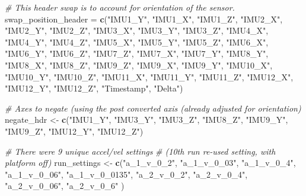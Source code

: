 \documentclass[]{article}
\newenvironment{Shaded}{\begin{snugshade}}{\end{snugshade}}
\newcommand{\CommentTok}[1]{\textcolor[rgb]{0.56,0.35,0.01}{\textit{#1}}}
\newcommand{\KeywordTok}[1]{\textcolor[rgb]{0.13,0.29,0.53}{\textbf{#1}}}
\newcommand{\NormalTok}[1]{#1}
\newcommand{\StringTok}[1]{\textcolor[rgb]{0.31,0.60,0.02}{#1}}
\begin{document}
\begin{Shaded}
\begin{Highlighting}[]
\CommentTok{# This header swap is to account for orientation of the sensor.}
\NormalTok{swap_position_header =}\StringTok{ }\KeywordTok{c}\NormalTok{(}\StringTok{"IMU1_Y"}\NormalTok{, }\StringTok{"IMU1_X"}\NormalTok{, }\StringTok{"IMU1_Z"}\NormalTok{,  }
                         \StringTok{"IMU2_X"}\NormalTok{, }\StringTok{"IMU2_Y"}\NormalTok{, }\StringTok{"IMU2_Z"}\NormalTok{, }
                         \StringTok{"IMU3_X"}\NormalTok{, }\StringTok{"IMU3_Y"}\NormalTok{, }\StringTok{"IMU3_Z"}\NormalTok{,}
                         \StringTok{"IMU4_X"}\NormalTok{, }\StringTok{"IMU4_Y"}\NormalTok{, }\StringTok{"IMU4_Z"}\NormalTok{,}
                         \StringTok{"IMU5_X"}\NormalTok{, }\StringTok{"IMU5_Y"}\NormalTok{, }\StringTok{"IMU5_Z"}\NormalTok{,}
                         \StringTok{"IMU6_X"}\NormalTok{, }\StringTok{"IMU6_Y"}\NormalTok{, }\StringTok{"IMU6_Z"}\NormalTok{,}
                         \StringTok{"IMU7_Z"}\NormalTok{, }\StringTok{"IMU7_X"}\NormalTok{, }\StringTok{"IMU7_Y"}\NormalTok{,}
                         \StringTok{"IMU8_Y"}\NormalTok{, }\StringTok{"IMU8_X"}\NormalTok{, }\StringTok{"IMU8_Z"}\NormalTok{,}
                         \StringTok{"IMU9_Z"}\NormalTok{, }\StringTok{"IMU9_X"}\NormalTok{, }\StringTok{"IMU9_Y"}\NormalTok{,  }
                         \StringTok{"IMU10_X"}\NormalTok{, }\StringTok{"IMU10_Y"}\NormalTok{, }\StringTok{"IMU10_Z"}\NormalTok{,}
                         \StringTok{"IMU11_X"}\NormalTok{, }\StringTok{"IMU11_Y"}\NormalTok{, }\StringTok{"IMU11_Z"}\NormalTok{,   }
                         \StringTok{"IMU12_X"}\NormalTok{, }\StringTok{"IMU12_Y"}\NormalTok{, }\StringTok{"IMU12_Z"}\NormalTok{,}
                         \StringTok{"Timestamp"}\NormalTok{,   }\StringTok{"Delta"}\NormalTok{)}


\CommentTok{# Axes to negate (using the post converted axis (already adjusted for orientation)}
\NormalTok{negate_hdr <-}\StringTok{ }\KeywordTok{c}\NormalTok{(}\StringTok{"IMU1_Y"}\NormalTok{, }\StringTok{"IMU3_Y"}\NormalTok{, }\StringTok{"IMU3_Z"}\NormalTok{, }
                \StringTok{"IMU8_Z"}\NormalTok{, }\StringTok{"IMU9_Y"}\NormalTok{, }\StringTok{"IMU9_Z"}\NormalTok{, }
                \StringTok{"IMU12_Y"}\NormalTok{, }\StringTok{"IMU12_Z"}\NormalTok{)}


\CommentTok{# There were 9 unique accel/vel settings }
\CommentTok{# (10th run re-used setting, with platform off)}
\NormalTok{run_settings <-}\StringTok{ }\KeywordTok{c}\NormalTok{(}\StringTok{"a_1_v_0_2"}\NormalTok{, }\StringTok{"a_1_v_0_03"}\NormalTok{, }\StringTok{"a_1_v_0_4"}\NormalTok{, }
                  \StringTok{"a_1_v_0_06"}\NormalTok{, }\StringTok{"a_1_v_0_0135"}\NormalTok{, }\StringTok{"a_2_v_0_2"}\NormalTok{, }
                  \StringTok{"a_2_v_0_4"}\NormalTok{, }\StringTok{"a_2_v_0_06"}\NormalTok{, }\StringTok{"a_2_v_0_6"}\NormalTok{ )}



\end{Highlighting}
\end{Shaded}
\end{document}
